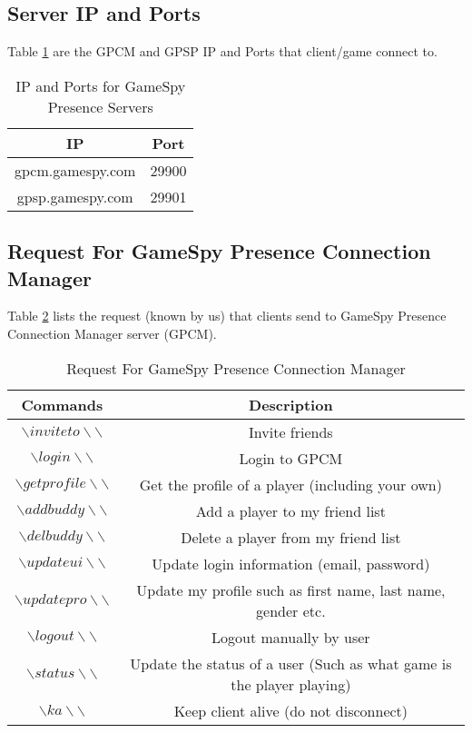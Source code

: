 \documentclass[oneside,titlepage,a4paper]{Definition/retrospy} %
\begin{document}
\subsection{Server IP and Ports}
Table \ref{IP and Ports for GameSpy Presence Servers} are the GPCM and GPSP IP and Ports that client/game connect to.
\begin{table}[H]
	\centering
	\begin{tabular}{|c|c|}
		\hline 
		\textbf{IP}&\textbf{Port}\\ 
		\hline 
		gpcm.gamespy.com&29900 \\ 
	 	\hline 
		gpsp.gamespy.com&29901 \\
		\hline
	\end{tabular} 
\caption{IP and Ports for GameSpy Presence Servers}
\label{IP and Ports for GameSpy Presence Servers}

\end{table}

\subsection{Request For GameSpy Presence Connection Manager}
Table \ref{Request For GameSpy Presence Connection Manager} lists the request (known by us) that clients send to GameSpy Presence Connection Manager server (GPCM).
\begin{table}[H]
	\centering
	\begin{tabular}{|c|c|}
		\hline 
		\textbf{Commands}&\textbf{Description}  \\ 
		\hline 
		$\backslash inviteto \backslash\backslash$& Invite friends\\ 		
		\hline 
		$\backslash login \backslash\backslash$&Login to GPCM \\
		\hline
 		$\backslash getprofile \backslash\backslash$&	Get the profile of a player (including your own)\\
 		\hline
		$\backslash addbuddy \backslash\backslash$& Add a player to my friend list \\
		\hline
		$\backslash delbuddy \backslash\backslash$ & Delete a player from my friend list \\
		\hline
		$\backslash updateui \backslash\backslash$& Update login information (email, password) \\
		\hline
		$\backslash updatepro \backslash\backslash$& Update my profile such as first name, last name, gender etc. \\
		\hline
		$\backslash logout \backslash\backslash$& Logout manually by user\\
		\hline
		$\backslash status \backslash\backslash$& Update the status of a user (Such as what game is the player playing) \\
		\hline
		$\backslash ka \backslash\backslash$& Keep client alive (do not disconnect) \\

		\hline 
	\end{tabular} 
	\caption{Request For GameSpy Presence Connection Manager}
	\label{Request For GameSpy Presence Connection Manager}
\end{table}
\end{document}
